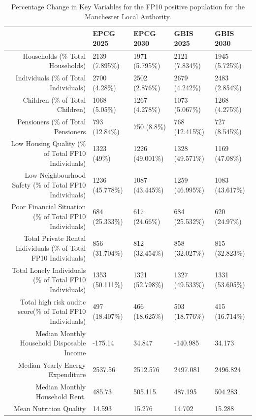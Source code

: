\begin{table}[ht]
\centering
\begingroup\scriptsize
\begin{tabular}{rllll}
  \hline
 & EPCG 2025 & EPCG 2030 & GBIS 2025 & GBIS 2030 \\ 
  \hline
Households (\% Total Households) & 2139 (7.895\%) & 1971 (5.795\%) & 2121 (7.834\%) & 1945 (5.725\%) \\ 
  Individuals (\% of Total Individuals) & 2700 (4.28\%) & 2502 (2.876\%) & 2679 (4.242\%) & 2483 (2.854\%) \\ 
  Children (\% of Total Children) & 1068 (5.05\%) & 1267 (4.278\%) & 1073 (5.067\%) & 1268 (4.275\%) \\ 
  Pensioners (\% of Total Pensioners & 793 (12.84\%) & 750 (8.8\%) & 768 (12.415\%) & 727 (8.545\%) \\ 
  Low Housing Quality (\% of Total FP10 Individuals) & 1323 (49\%) & 1226 (49.001\%) & 1328 (49.571\%) & 1169 (47.08\%) \\ 
  Low Neighbourhood Safety (\% of Total FP10 Individuals) & 1236 (45.778\%) & 1087 (43.445\%) & 1259 (46.995\%) & 1083 (43.617\%) \\ 
  Poor Financial Situation (\% of Total FP10 Individuals) & 684 (25.333\%) & 617 (24.66\%) & 684 (25.532\%) & 620 (24.97\%) \\ 
  Total Private Rental Individuals (\% of Total FP10 Individuals) & 856 (31.704\%) & 812 (32.454\%) & 858 (32.027\%) & 815 (32.823\%) \\ 
  Total Lonely Individuals (\% of Total FP10 Individuals) & 1353 (50.111\%) & 1321 (52.798\%) & 1327 (49.533\%) & 1331 (53.605\%) \\ 
  Total high risk auditc score(\% of Total FP10 Individuals) & 497 (18.407\%) & 466 (18.625\%) & 503 (18.776\%) & 415 (16.714\%) \\ 
  Median Monthly Household Disposable Income & -175.14 & 34.847 & -140.985 & 34.173 \\ 
  Median Yearly Energy Expenditure & 2537.56 & 2512.576 & 2497.081 & 2496.824 \\ 
  Median Monthly Household Rent. & 485.73 & 505.115 & 487.195 & 504.283 \\ 
  Mean Nutrition Quality & 14.593 & 15.276 & 14.702 & 15.288 \\ 
   \hline
\end{tabular}
\endgroup
\caption{Percentage Change in Key Variables for the FP10 positive population for the Manchester Local Authority.} 
\label{tab: manchester_circumstances_table}
\end{table}
